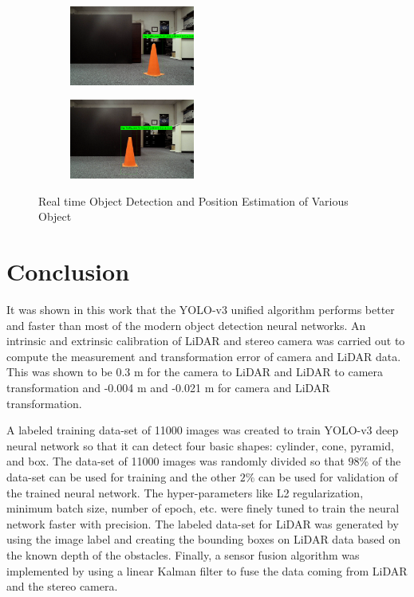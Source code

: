 \begin{figure}
\begin{subfigure}[]
        \centering
        \includegraphics[width=0.45\textwidth]{Images/TC_d97cm.PNG}
    \end{subfigure}
    \begin{subfigure}[]
        \centering
        \includegraphics[width=0.45\textwidth]{Images/TC_d103cm.PNG}
    \end{subfigure}    
    \caption{Real time Object Detection and Position Estimation of Various Object}
    \label{realtimeestimation}
\end{figure}



\section{Conclusion}
It was shown in this work that the YOLO-v3 unified algorithm performs better and faster than most of the modern object detection neural networks. An intrinsic and extrinsic calibration of LiDAR and stereo camera was carried out to compute the measurement and transformation error of camera and LiDAR data. This was shown to be 0.3 m for the camera to LiDAR and LiDAR to camera transformation and -0.004 m and -0.021 m for camera and LiDAR transformation.

A labeled training data-set of 11000 images was created to train YOLO-v3 deep neural network so that it can detect four basic shapes: cylinder, cone, pyramid, and box. The data-set of 11000 images was randomly divided so that \(98\%\) of the data-set can be used for training and the other \(2\%\) can be used for validation of the trained neural network. The hyper-parameters like L2 regularization, minimum batch size, number of epoch, etc. were finely tuned to train the neural network faster with precision. The labeled data-set for LiDAR was generated by using the image label and creating the bounding boxes on LiDAR data based on the known depth of the obstacles. Finally, a sensor fusion algorithm was implemented by using a linear Kalman filter to fuse the data coming from LiDAR and the stereo camera.


